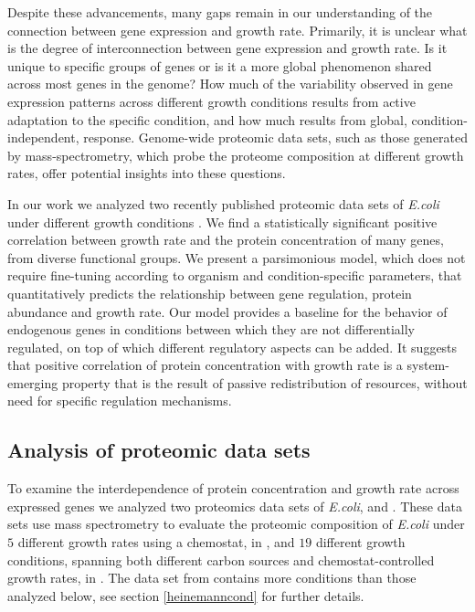\documentclass[notitlepage]{article}
\begin{document}
Despite these advancements, many gaps remain in our understanding of the connection between gene expression and growth rate.
Primarily, it is unclear what is the degree of interconnection between gene expression and growth rate.
Is it unique to specific groups of genes or is it a more global phenomenon shared across most genes in the genome?
How much of the variability observed in gene expression patterns across different growth conditions results from active adaptation to the specific condition, and how much results from global, condition-independent, response.
Genome-wide proteomic data sets, such as those generated by mass-spectrometry, which probe the proteome composition at different growth rates, offer potential insights into these questions.

In our work we analyzed two recently published proteomic data sets of \emph{E.coli} under different growth conditions \cite{Valgepea2013,Heinemann2014}.
We find a statistically significant positive correlation between growth rate and the protein concentration of many genes, from diverse functional groups.
We present a parsimonious model, which does not require fine-tuning according to organism and condition-specific parameters, that quantitatively predicts the relationship between gene regulation, protein abundance and growth rate.
Our model provides a baseline for the behavior of endogenous genes in conditions between which they are not differentially regulated, on top of which different regulatory aspects can be added.
It suggests that positive correlation of protein concentration with growth rate is a system-emerging property that is the result of passive redistribution of resources, without need for specific regulation mechanisms.

\subsection{Analysis of proteomic data sets}
To examine the interdependence of protein concentration and growth rate across expressed genes we analyzed two proteomics data sets of \emph{E.coli}, \cite{Valgepea2013} and \cite{Heinemann2014}.
These data sets use mass spectrometry to evaluate the proteomic composition of \emph{E.coli} under $5$ different growth rates using a chemostat, in \cite{Valgepea2013}, and $19$ different growth conditions, spanning both different carbon sources and chemostat-controlled growth rates, in \cite{Heinemann2014}.
The data set from \cite{Heinemann2014} contains more conditions than those analyzed below, see section \ref{heinemanncond} for further details.
\end{document}
